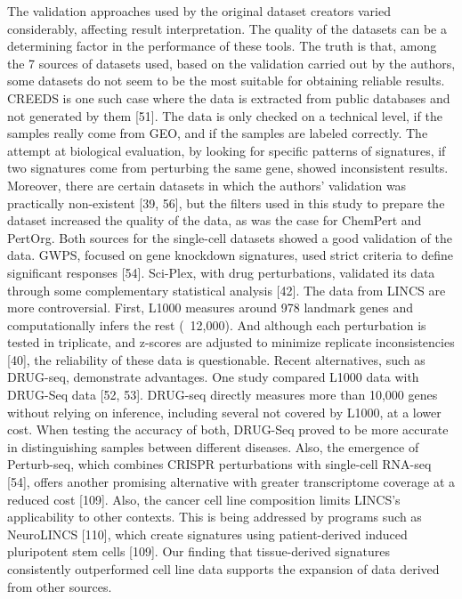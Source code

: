 The validation approaches used by the original dataset creators varied considerably, affecting result interpretation. The quality of the datasets can be a determining factor in the performance of these tools. The truth is that, among the 7 sources of datasets used, based on the validation carried out by the authors, some datasets do not seem to be the most suitable for obtaining reliable results. CREEDS is one such case where the data is extracted from public databases and not generated by them [51]. The data is only checked on a technical level, if the samples really come from GEO, and if the samples are labeled correctly. The attempt at biological evaluation, by looking for specific patterns of signatures, if two signatures come from perturbing the same gene, showed inconsistent results. Moreover, there are certain datasets in which the authors' validation was practically non-existent [39, 56], but the filters used in this study to prepare the dataset increased the quality of the data, as was the case for ChemPert and PertOrg. Both sources for the single-cell datasets showed a good validation of the data. GWPS, focused on gene knockdown signatures, used strict criteria to define significant responses [54]. Sci-Plex, with drug perturbations, validated its data through some complementary statistical analysis [42]. The data from LINCS are more controversial. First, L1000 measures around 978 landmark genes and computationally infers the rest (~12,000). And although each perturbation is tested in triplicate, and z-scores are adjusted to minimize replicate inconsistencies [40], the reliability of these data is questionable. Recent alternatives, such as DRUG-seq, demonstrate advantages. One study compared L1000 data with DRUG-Seq data [52, 53]. DRUG-seq directly measures more than 10,000 genes without relying on inference, including several not covered by L1000, at a lower cost. When testing the accuracy of both, DRUG-Seq proved to be more accurate in distinguishing samples between different diseases. Also, the emergence of Perturb-seq, which combines CRISPR perturbations with single-cell RNA-seq [54], offers another promising alternative with greater transcriptome coverage at a reduced cost [109]. Also, the cancer cell line composition limits LINCS's applicability to other contexts. This is being addressed by programs such as NeuroLINCS [110], which create signatures using patient-derived induced pluripotent stem cells [109]. Our finding that tissue-derived signatures consistently outperformed cell line data supports the expansion of data derived from other sources.
